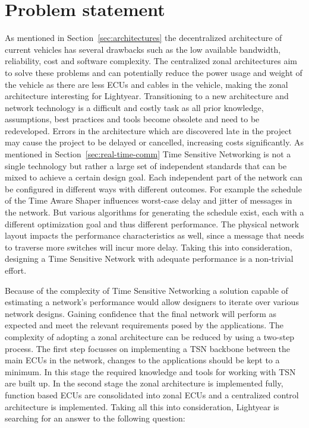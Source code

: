 \section{Problem statement}
\label{sec:problem_statement}
As mentioned in Section~\ref{sec:architectures} the decentralized architecture of current vehicles has several drawbacks such as the low available bandwidth, reliability, cost and software complexity. The centralized zonal architectures aim to solve these problems and can potentially reduce the power usage and weight of the vehicle as there are less ECUs and cables in the vehicle, making the zonal architecture interesting for Lightyear. Transitioning to a new architecture and network technology is a difficult and costly task as all prior knowledge, assumptions, best practices and tools become obsolete and need to be redeveloped. Errors in the architecture which are discovered late in the project may cause the project to be delayed or cancelled, increasing costs significantly. As mentioned in Section~\ref{sec:real-time-comm} Time Sensitive Networking is not a single technology but rather a large set of independent standards that can be mixed to achieve a certain design goal. Each independent part of the network can be configured in different ways with different outcomes. For example the schedule of the Time Aware Shaper influences worst-case delay and jitter of messages in the network. But various algorithms for generating the schedule exist, each with a different optimization goal and thus different performance. The physical network layout impacts the performance characteristics as well, since a message that needs to traverse more switches will incur more delay. Taking this into consideration, designing a Time Sensitive Network with adequate performance is a non-trivial effort.

Because of the complexity of Time Sensitive Networking a solution capable of estimating a network's performance would allow designers to iterate over various network designs. Gaining confidence that the final network will perform as expected and meet the relevant requirements posed by the applications. The complexity of adopting a zonal architecture can be reduced by using a two-step process. The first step focusses on implementing a TSN backbone between the main ECUs in the network, changes to the applications should be kept to a minimum. In this stage the required knowledge and tools for working with TSN are built up. In the second stage the zonal architecture is implemented fully, function based ECUs are consolidated into zonal ECUs and a centralized control architecture is implemented. Taking all this into consideration, Lightyear is searching for an answer to the following question:

